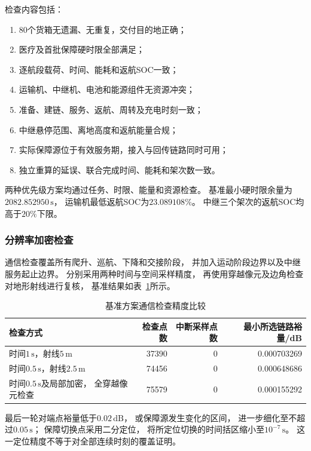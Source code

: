 \documentclass[bwprint]{gmcmthesis}
\begin{document}
检查内容包括：
\begin{enumerate}
    \item 80个货箱无遗漏、无重复，交付目的地正确；
    \item 医疗及首批保障硬时限全部满足；
    \item 逐航段载荷、时间、能耗和返航SOC一致；
    \item 运输机、中继机、电池和能源组件无资源冲突；
    \item 准备、建链、服务、返航、周转及充电时刻一致；
    \item 中继悬停范围、离地高度和返航能量合规；
    \item 实际保障源位于有效服务期，接入与回传链路同时可用；
    \item 独立重算的延误、联合完成时间、能耗和架次数一致。
\end{enumerate}

两种优先级方案均通过任务、时限、能量和资源检查。
基准最小硬时限余量为$2082.852950\,\mathrm{s}$，
运输机最低返航SOC为$23.089108\%$。
中继三个架次的返航SOC均高于$20\%$下限。

\subsubsection{分辨率加密检查}

通信检查覆盖所有爬升、巡航、下降和交接阶段，
并加入运动阶段边界以及中继服务起止边界。
分别采用两种时间与空间采样精度，
再使用穿越像元及边角检查对地形射线进行复核，
基准结果如表~\ref{tab:q3_refinement}所示。

\begin{table}[htbp]
    \centering
    \caption{基准方案通信检查精度比较}
    \label{tab:q3_refinement}
    \small
    \begin{tabular}{lrrr}
        \toprule
        检查方式 & 检查点数 &
        中断采样点数 & 最小所选链路裕量/dB \\
        \midrule
        时间$1\,\mathrm{s}$，射线$5\,\mathrm{m}$
        &37390&0&0.000703269\\
        时间$0.5\,\mathrm{s}$，射线$2.5\,\mathrm{m}$
        &74456&0&0.000648686\\
        时间$0.5\,\mathrm{s}$及局部加密，
        全穿越像元检查
        &75579&0&0.000155292\\
        \bottomrule
    \end{tabular}
\end{table}

最后一轮对端点裕量低于$0.02\,\mathrm{dB}$，
或保障源发生变化的区间，
进一步细化至不超过$0.05\,\mathrm{s}$；
保障切换点采用二分定位，
将所定位切换的时间括区缩小至$10^{-7}\,\mathrm{s}$。
这一定位精度不等于对全部连续时刻的覆盖证明。
\end{document}
